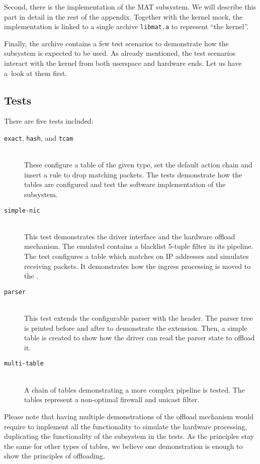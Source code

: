 Second, there is the implementation of the MAT subsystem. We will describe this
part in detail in the rest of the appendix. Together with the kernel mock, the
implementation is linked to a single archive \texttt{libmat.a} to represent
``the kernel''.

Finally, the archive contains a few test scenarios to demonstrate how the
subsystem is expected to be used. As already mentioned, the test scenarios
interact with the kernel from both userspace and hardware ends. Let us have
a~look at them first.

\subsection{Tests}

There are five tests included:

\begin{description}
	\item[\texttt{exact}, \texttt{hash}, and \texttt{tcam}] \hfill \\
		These configure a table of the given type, set the default action chain
		and insert a rule to drop matching packets. The tests demonstrate how
		the tables are configured and test the software implementation of the
		subsystem.

	\item[\texttt{simple-nic}] \hfill \\
		This test demonstrates the driver interface and the hardware offload
		mechanism. The emulated  contains a blacklist 5-tuple filter in
		its pipeline. The test configures a table which matches on IP addresses
		and simulates receiving packets. It demonstrates how the ingress
		processing is moved to the .

	\item[\texttt{parser}] \hfill \\
		This test extends the configurable parser with the  header.
		The parser tree is printed before and after to demonstrate the
		extension. Then, a simple table is created to show how the driver can
		read the parser state to offload it.

	\item[\texttt{multi-table}] \hfill \\
		A chain of tables demonstrating a more complex pipeline is tested.
		The tables represent a non-optimal firewall and unicast  filter.
\end{description}

\noindent Please note that having multiple demonstrations of the offload
mechanism would require to implement all the functionality to simulate the
hardware processing, duplicating the functionality of the subsystem in the
tests. As the principles stay the same for other types of tables, we believe
one demonstration is enough to show the principles of offloading.

